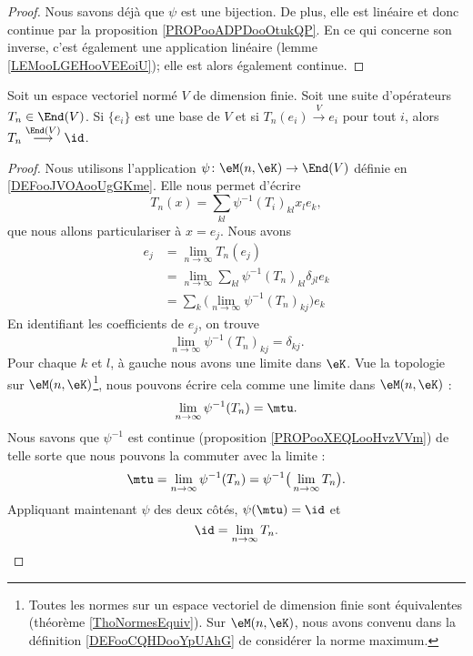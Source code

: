 \begin{proof}
	Nous savons déjà que \( \psi\) est une bijection. De plus, elle est linéaire et donc continue par la proposition \ref{PROPooADPDooOtukQP}. En ce qui concerne son inverse, c'est également une application linéaire (lemme \ref{LEMooLGEHooVEEoiU}); elle est alors également continue.
\end{proof}
\begin{proposition}     \label{PROPooDRHMooYzXbkl}
	Soit un espace vectoriel normé \( V\) de dimension finie. Soit une suite d'opérateurs \( T_n\in \End(V)\). Si \( \{ e_i \}\) est une base de \( V\) et si \( T_n(e_i)\stackrel{V}{\longrightarrow}e_i\) pour tout \( i\), alors \( T_n\stackrel{\End(V)}{\longrightarrow}\id\).
\end{proposition}

\begin{proof}
	Nous utilisons l'application \( \psi\colon \eM(n,\eK)\to \End(V)\) définie en \ref{DEFooJVOAooUgGKme}. Elle nous permet d'écrire
	\begin{equation}
		T_n(x)=\sum_{kl}\psi^{-1}(T_i)_{kl}x_le_k,
	\end{equation}
	que nous allons particulariser à \( x=e_j\). Nous avons
	\begin{subequations}
		\begin{align}
			e_j & =\lim_{n\to \infty} T_n(e_j)                                            \\
			    & =\lim_{n\to \infty} \sum_{kl}\psi^{-1}(T_n)_{kl}\delta_{jl}e_k         \\
			    & =\sum_{k}\big( \lim_{n\to \infty} \psi^{-1}(T_n)_{kj} \big)e_k
		\end{align}
	\end{subequations}
	En identifiant les coefficients de \( e_j\), on trouve
	\begin{equation}
		\lim_{n\to \infty} \psi^{-1}(T_n)_{kj}=\delta_{kj}.
	\end{equation}
	Pour chaque \( k\) et \( l\), à gauche nous avons une limite dans \( \eK\). Vue la topologie sur \( \eM(n,\eK)\)\footnote{Toutes les normes sur un espace vectoriel de dimension finie sont équivalentes (théorème \ref{ThoNormesEquiv}). Sur \( \eM(n,\eK)\), nous avons convenu dans la définition \ref{DEFooCQHDooYpUAhG} de considérer la norme maximum.}, nous pouvons écrire cela comme une limite dans \( \eM(n,\eK)\) :
	\begin{equation}
		\lim_{n\to \infty} \psi^{-1}(T_n)=\mtu.
	\end{equation}
	Nous savons que \( \psi^{-1}\) est continue (proposition \ref{PROPooXEQLooHvzVVm}) de telle sorte que nous pouvons la commuter avec la limite :
	\begin{equation}
		\mtu= \lim_{n\to \infty} \psi^{-1}(T_n)=\psi^{-1}\big( \lim_{n\to \infty} T_n \big).
	\end{equation}
	Appliquant maintenant \( \psi\) des deux côtés, \( \psi(\mtu)=\id\) et
	\begin{equation}
		\id=\lim_{n\to \infty} T_n.
	\end{equation}
\end{proof}


